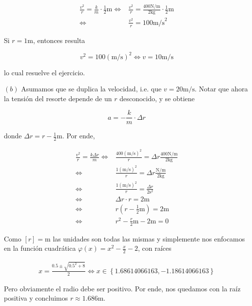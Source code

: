 \documentclass[12pt]{article}
\theoremstyle{definition}
\begin{document}
\begin{align*}
    \frac{v^2}{r} = \frac{k}{m} \cdot \frac{1}{2}\text{m}
    \iff 
    &\frac{v^2}{r} = \frac{400\text{N/m}}{2\text{kg}} \cdot \frac{1}{2}\text{m}\\ 
    \iff ~ ~ ~ 
    &\frac{v^2}{r} = 100 \text{m/s}^2
\end{align*}

Si $r = 1\text{m}$, entonces resulta 

\begin{equation*}
    v^2 = 100 (\text{m/s})^2 \iff v = 10\text{m/s}
\end{equation*}

lo cual resuelve el ejercicio.

$(b)$ Asumamos que se duplica la velocidad, i.e. que $v = 20\text{m/s}$. Notar
que ahora la tensión del resorte depende de un $r$ desconocido, y se obtiene

\begin{equation*}
    a = -\frac{k}{m} \cdot \Delta r
\end{equation*}

donde $\Delta r = r - \frac{1}{2}\text{m}$. Por ende,

\begin{align*}
    \frac{v^2}{r} = \frac{k\Delta r}{m}
    \iff 
    &\frac{400(\text{m/s})^2}{r} =  \Delta r \frac{400\text{N/m}}{2\text{kg}}\\
    \iff ~ ~ ~ 
    &\frac{1(\text{m/s})^2}{r} = \Delta r \frac{\text{N/m}}{2\text{kg}} \\ 
    \iff ~ ~ ~ 
    &\frac{1(\text{m/s})^2}{r} = \frac{ \Delta r }{2\text{s}^2}  \\ 
    \iff ~ ~ ~ 
    &\Delta r \cdot r = 2\text{m} \\ 
    \iff ~ ~ ~ 
    &r (r - \frac{1}{2}\text{m}) = 2\text{m} \\ 
    \iff ~ ~ ~ 
    &r^2 - \frac{r}{2}\text{m} - 2\text{m} = 0 
\end{align*}

Como $[r] = \text{m}$ las unidades son todas las mismas y simplemente nos
enfocamos en la función cuadrática $\varphi(x) = x^2 - \frac{x}{2} - 2$, con
raíces 

\begin{align*}
    x = \frac{0.5 \pm \sqrt{0.5^2 + 8}}{2} \iff x \in \left\{ 1.68614066163,
    -1.18614066163 \right\} 
\end{align*}

Pero obviamente el radio debe ser positivo. Por ende, nos quedamos con la raíz
positiva y concluimos $r \approx 1.686\text{m}$. 
\end{document}
